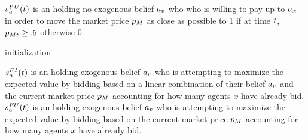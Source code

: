 $s^{YU}_a(t)$ is an  holding no exogenous belief $a_v$ who who is willing to pay up to $a_x$ in order to move the market price $p_M$ as close as possible to 1 if at time $t$, $p_{Mt} \ge .5$ otherwise 0. \\

\begin{algorithm}[H]
\SetAlgoLined
{}
initialization\;
\end{algorithm}

$s^{FI}_a(t)$ is an holding exogenous belief $a_v$ who is attempting to maximize the expected value by bidding based on a linear combination of their belief $a_v$ and the current market price $p_M$ accounting for how many agents $x$ have already bid. \\

$s^{FU}_a(t)$ is an  holding exogenous belief $a_v$ who is attempting to maximize the expected value by bidding based on the current market price $p_M$ accounting for how many agents $x$ have already bid. \\
